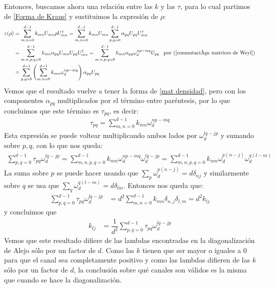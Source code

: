 Entonces, buscamos ahora una relación entre  las $k$ y las $\tau$, para lo cual partimos de \ref{Forma de Kraus} y sustituimos la expresión de $\rho$:
\begin{align*}
\varepsilon(\rho) &= \sum_{m,n=0}^{d-1} k_{mn} U_{mn} \rho U_{mn}^{\dagger} = \sum_{m,n=0}^{d-1} k_{mn} U_{mn}  \sum_{p,q=0}^{d-1} \alpha_{pq} U_{pq} U_{mn}^{\dagger} \\ 
& = \sum_{m,n,p,q=0}^{d-1} k_{mn} \alpha_{pq} U_{mn} U_{pq} U_{mn}^{\dagger}  = \sum_{m,n,p,q=0}^{d-1} k_{mn} \alpha_{pq} \omega_d^{np-mq} U_{pq} \;\;\; \text{por (\ref{conmutación matrices de Weyl})} \\
& = \sum_{p,q=0}^{d-1} \left( \sum_{m,n=0}^{d-1} k_{mn} \omega_d^{np-mq} \right) \alpha_{pq} U_{pq}
\end{align*}
Vemos que el resultado vuelve a tener la forma de \ref{mat densidad}, pero con los componentes $\alpha_{pq}$ multiplicados por el término entre paréntesis, por lo que concluimos que este término es $\tau_{pq}$, es decir:
\begin{align}
\tau_{pq} = \sum_{m,n=0}^{d-1} k_{mn} \omega_d^{np-mq}
\end{align}
Esta expresión se puede voltear multiplicando ambos lados por $\omega_d^{lq-jp}$ y sumando sobre $p, q$, con lo que nos queda:
\begin{align*}
\sum_{p,q=0}^{d-1} \tau_{pq} \omega_d^{lq-jp} = \sum_{m,n,p,q=0}^{d-1} k_{mn} \omega_d^{np-mq} \omega_d^{lq-jp} = \sum_{m,n,p,q=0}^{d-1} k_{mn} \omega_d^{p(n-j)} \omega_d^{q(l-m)}
\end{align*}
La suma sobre $p$ se puede hacer usando que $\sum_p \omega_d^{p(n-j)} = d \delta_{nj}$ y similarmente sobre $q$ se usa que $\sum_q \omega_d^{q(l-m)} = d \delta_{lm}$.  Entonces nos queda que:
\begin{align*}
\sum_{p,q=0}^{d-1} \tau_{pq} \omega_d^{lq-jp} & = d^2 \sum_{m,n=0}^{d-1} k_{mn} \delta_{n,j} \delta_{l,m} = d^2 k_{lj}
\end{align*}
y concluimos que
\begin{align}
\label{k en terminos de lambda}
k_{lj} & =  \dfrac{1}{d^2} \sum_{p,q=0}^{d-1} \tau_{pq} \omega_d^{lq-jp} 
\end{align}
Vemos que este resultado difiere de las lambdas encontradas en la diagonalización de Alejo sólo por un factor de $d$.
Como las $k$ tienen que ser mayor o iguales a $0$ para que el canal sea completamente positivo y como las lambdas difieren de las $k$ sólo por un factor de $d$,  la conclusión sobre qué canales son válidos es la misma que cuando se hace la diagonalización. 


